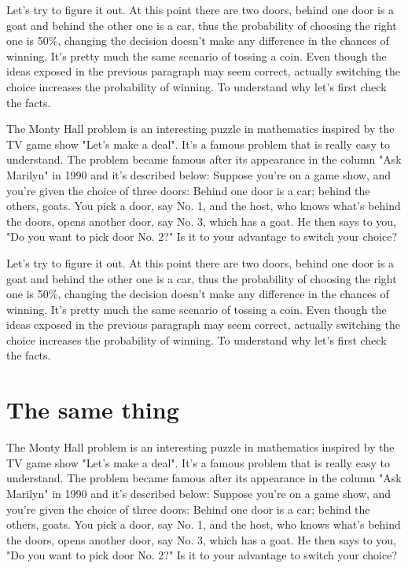 \documentclass{oscmjournal}
\begin{document}
Let's try to figure it out. At this point there are two doors, behind one door is a goat  and behind the other one is a car, thus the probability of choosing the right one is 50\%, changing the decision doesn't make any difference in the chances of winning. It's pretty much the same scenario of tossing a coin. Even though the ideas exposed in the previous paragraph may seem correct, actually switching the choice increases the probability of winning. To understand why let's  first check the facts.

The Monty Hall problem is an interesting puzzle in mathematics inspired by the TV  game show "Let's make a deal". It's a famous problem that is really easy to understand. The problem became famous after its appearance in the column "Ask Marilyn" in 1990 and  it's described below: Suppose you're on a game show, and you're given the choice of three doors: Behind one  door is a car; behind the others, goats. You pick a door, say No. 1, and the host, who  knows what's behind the doors, opens another door, say No. 3, which has a goat. He then  says to you, "Do you want to pick door No. 2?" Is it to your advantage to switch your choice?

Let's try to figure it out. At this point there are two doors, behind one door is a goat  and behind the other one is a car, thus the probability of choosing the right one is 50\%, changing the decision doesn't make any difference in the chances of winning. It's pretty much the same scenario of tossing a coin. Even though the ideas exposed in the previous paragraph may seem correct, actually switching the choice increases the probability of winning. To understand why let's  first check the facts.


\section{The same thing}

The Monty Hall problem is an interesting puzzle in mathematics inspired by the TV  game show "Let's make a deal". It's a famous problem that is really easy to understand. The problem became famous after its appearance in the column "Ask Marilyn" in 1990 and  it's described below: Suppose you're on a game show, and you're given the choice of three doors: Behind one  door is a car; behind the others, goats. You pick a door, say No. 1, and the host, who  knows what's behind the doors, opens another door, say No. 3, which has a goat. He then  says to you, "Do you want to pick door No. 2?" Is it to your advantage to switch your choice?
\end{document}
